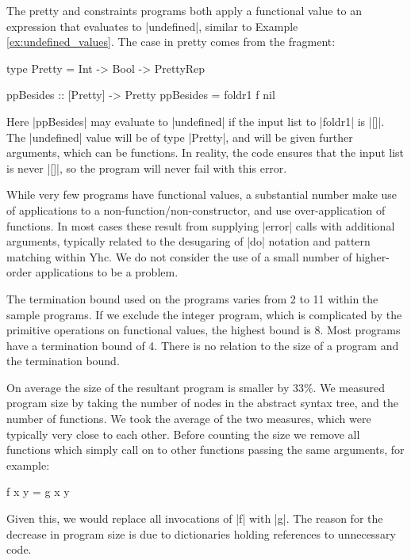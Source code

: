 \documentclass[preprint]{sigplanconf}
\begin{document}
The pretty and constraints programs both apply a functional value to an expression that evaluates to |undefined|, similar to Example \ref{ex:undefined_values}. The case in pretty comes from the fragment:

\begin{comment}
\begin{code}
data PrettyRep = PrettyRep
\end{code}
\end{comment}
\begin{code}
type Pretty = Int -> Bool -> PrettyRep

ppBesides     :: [Pretty] -> Pretty
ppBesides = foldr1 f nil
\end{code}

Here |ppBesides| may evaluate to |undefined| if the input list to |foldr1| is |[]|. The |undefined| value will be of type |Pretty|, and will be given further arguments, which can be functions. In reality, the code ensures that the input list is never |[]|, so the program will never fail with this error.

While very few programs have functional values, a substantial number make use of applications to a non-function/non-constructor, and use over-application of functions. In most cases these result from supplying |error| calls with additional arguments, typically related to the desugaring of |do| notation and pattern matching within Yhc. We do not consider the use of a small number of higher-order applications to be a problem.

The termination bound used on the programs varies from 2 to 11 within the sample programs. If we exclude the integer program, which is complicated by the primitive operations on functional values, the highest bound is 8. Most programs have a termination bound of 4. There is no relation to the size of a program and the termination bound.

On average the size of the resultant program is smaller by 33\%. We measured program size by taking the number of nodes in the abstract syntax tree, and the number of functions. We took the average of the two measures, which were typically very close to each other. Before counting the size we remove all functions which simply call on to other functions passing the same arguments, for example:

\begin{code}
f x y = g x y
\end{code}

Given this, we would replace all invocations of |f| with |g|. The reason for the decrease in program size is due to dictionaries holding references to unnecessary code.
\end{document}
